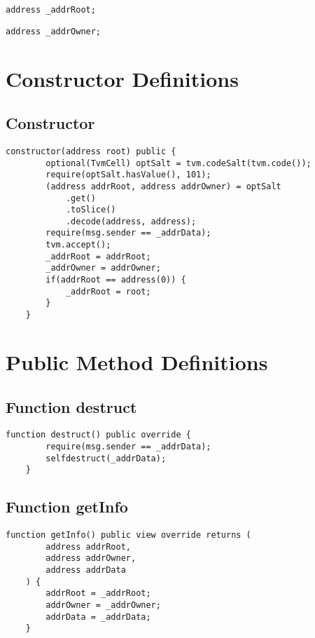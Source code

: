 \begin{lstlisting}[firstnumber=9]
    address _addrRoot;
\end{lstlisting}

\begin{lstlisting}[firstnumber=10]
    address _addrOwner;
\end{lstlisting}

\section{Constructor Definitions}


\subsection{Constructor}



\begin{lstlisting}[firstnumber=13]
    constructor(address root) public {
        optional(TvmCell) optSalt = tvm.codeSalt(tvm.code());
        require(optSalt.hasValue(), 101);
        (address addrRoot, address addrOwner) = optSalt
            .get()
            .toSlice()
            .decode(address, address);
        require(msg.sender == _addrData);
        tvm.accept();
        _addrRoot = addrRoot;
        _addrOwner = addrOwner;
        if(addrRoot == address(0)) {
            _addrRoot = root;
        }
    }
\end{lstlisting}

\section{Public Method Definitions}


\subsection{Function destruct}

\begin{lstlisting}[firstnumber=39]
    function destruct() public override {
        require(msg.sender == _addrData);
        selfdestruct(_addrData);
    }
\end{lstlisting}

\subsection{Function getInfo}

\begin{lstlisting}[firstnumber=29]
    function getInfo() public view override returns (
        address addrRoot,
        address addrOwner,
        address addrData
    ) {
        addrRoot = _addrRoot;
        addrOwner = _addrOwner;
        addrData = _addrData;
    }
\end{lstlisting}
